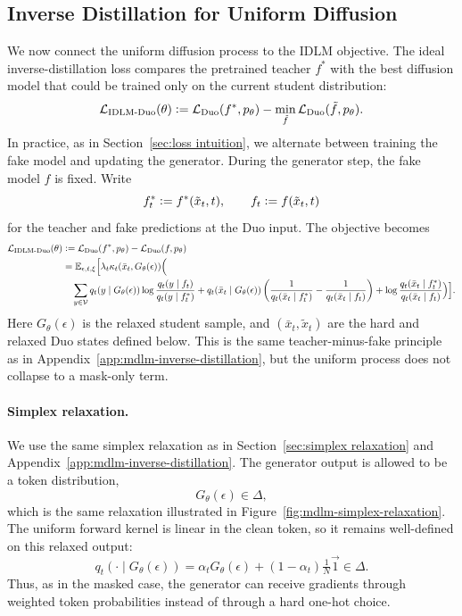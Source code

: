 \begin{reviewblock}
\subsection{Inverse Distillation for Uniform Diffusion}
\label{app:uniform-inverse-distillation}
We now connect the uniform diffusion process to the IDLM objective. The ideal
inverse-distillation loss compares the pretrained teacher $f^*$ with the best
diffusion model that could be trained only on the current student distribution:
\begin{equation}
\label{eq:idlm-duo-compact}
    \mathcal{L}_{\mathrm{IDLM\text{-}Duo}}(\theta)
    \vcentcolon=
    \mathcal{L}_{\mathrm{Duo}}(f^*,p_\theta)
    -
    \min_{\tilde f}\mathcal{L}_{\mathrm{Duo}}(\tilde f,p_\theta).
\end{equation}
In practice, as in Section~\ref{sec:loss intuition}, we alternate between
training the fake model and updating the generator. During the generator step,
the fake model $f$ is fixed. Write
\[
    f_t^* \vcentcolon= f^*(\tilde{x}_t,t),
    \qquad
    f_t \vcentcolon= f(\tilde{x}_t,t)
\]
for the teacher and fake predictions at the Duo input. The objective becomes
\begin{equation}
\label{eq:idlm-duo-fixed}
\begin{aligned}
    \mathcal{L}_{\mathrm{IDLM\text{-}Duo}}(\theta)
    &\vcentcolon=
    \mathcal{L}_{\mathrm{Duo}}(f^*,p_\theta)
    -
    \mathcal{L}_{\mathrm{Duo}}(f,p_\theta)
    \\
    &=
    \mathbb{E}_{\epsilon,t,\xi}
    \Bigl[
    \lambda_t\kappa_t(\bar{x}_t,G_\theta(\epsilon))
    \Bigl(
    \\
    &\quad
    \sum_{y\in\mathcal{V}}q_t(y\mid G_\theta(\epsilon))\log\frac{q_t(y\mid f_t)}{q_t(y\mid f_t^*)}
    + q_t(\bar{x}_t\mid G_\theta(\epsilon))
    \left(\frac{1}{q_t(\bar{x}_t\mid f_t^*)}-\frac{1}{q_t(\bar{x}_t\mid f_t)}\right)
    + \log\frac{q_t(\bar{x}_t\mid f_t^*)}{q_t(\bar{x}_t\mid f_t)}
    \Bigr)
    \Bigr].
\end{aligned}
\end{equation}
Here $G_\theta(\epsilon)$ is the relaxed student sample, and
$(\bar{x}_t,\tilde{x}_t)$ are the hard and relaxed Duo states defined below.
This is the same teacher-minus-fake principle as in Appendix~\ref{app:mdlm-inverse-distillation}, but the uniform process does not collapse to a mask-only term.

\paragraph{Simplex relaxation.}
We use the same simplex relaxation as in Section~\ref{sec:simplex relaxation}
and Appendix~\ref{app:mdlm-inverse-distillation}. The generator output is
allowed to be a token distribution,
\[
    G_\theta(\epsilon)\in\Delta ,
\]
which is the same relaxation illustrated in
Figure~\ref{fig:mdlm-simplex-relaxation}. The uniform forward kernel is linear
in the clean token, so it remains well-defined on this relaxed output:
\[
    q_t(\cdot\mid G_\theta(\epsilon))
    =
    \alpha_tG_\theta(\epsilon)+(1-\alpha_t)\tfrac{1}{N}\vec{1}
    \in\Delta .
\]
Thus, as in the masked case, the generator can receive gradients through
weighted token probabilities instead of through a hard one-hot choice.


\end{reviewblock}
